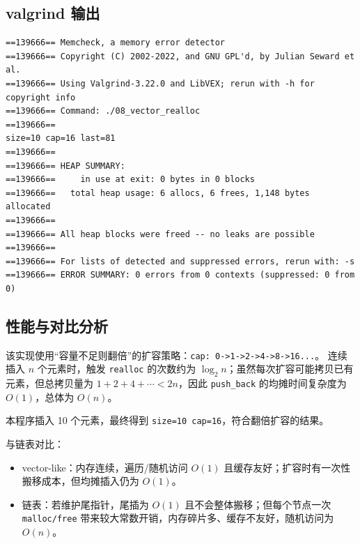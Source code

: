 \documentclass[fleqn]{ctexart}
\begin{document}
\subsection*{valgrind 输出}
\begin{verbatim}
==139666== Memcheck, a memory error detector
==139666== Copyright (C) 2002-2022, and GNU GPL'd, by Julian Seward et al.
==139666== Using Valgrind-3.22.0 and LibVEX; rerun with -h for copyright info
==139666== Command: ./08_vector_realloc
==139666== 
size=10 cap=16 last=81
==139666== 
==139666== HEAP SUMMARY:
==139666==     in use at exit: 0 bytes in 0 blocks
==139666==   total heap usage: 6 allocs, 6 frees, 1,148 bytes allocated
==139666== 
==139666== All heap blocks were freed -- no leaks are possible
==139666== 
==139666== For lists of detected and suppressed errors, rerun with: -s
==139666== ERROR SUMMARY: 0 errors from 0 contexts (suppressed: 0 from 0)
\end{verbatim}

\subsection*{性能与对比分析}
该实现使用“容量不足则翻倍”的扩容策略：\verb|cap: 0->1->2->4->8->16...|。
连续插入 $n$ 个元素时，触发 \verb|realloc| 的次数约为 $\log_2 n$；虽然每次扩容可能拷贝已有元素，但总拷贝量为 $1+2+4+\cdots < 2n$，因此 \verb|push_back| 的均摊时间复杂度为 $O(1)$，总体为 $O(n)$。

本程序插入 10 个元素，最终得到 \verb|size=10 cap=16|，符合翻倍扩容的结果。

与链表对比：
\begin{itemize}[leftmargin=2em]
\item vector-like：内存连续，遍历/随机访问 $O(1)$ 且缓存友好；扩容时有一次性搬移成本，但均摊插入仍为 $O(1)$。
\item 链表：若维护尾指针，尾插为 $O(1)$ 且不会整体搬移；但每个节点一次 \verb|malloc/free| 带来较大常数开销，内存碎片多、缓存不友好，随机访问为 $O(n)$。
\end{itemize}
\end{document}
